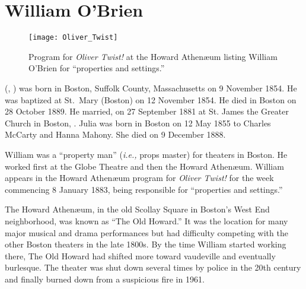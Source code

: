 \section{William O'Brien}\label{per:William3OBrien}

\begin{figure}[p]
	\centering
	\texttt{[image: Oliver\_Twist]}
	\caption{Program for \textit{Oliver Twist!} at the Howard Athen\ae um listing William O'Brien for ``properties and settings.''}
	\label{fig:OliverTwist}
\end{figure}

 (, ) was born in Boston, Suffolk County, Massachusetts on 9 November 1854.\cite{William3OBrienBirth} He was baptized at St.\ Mary (Boston) on 12 November 1854.\cite{William3OBrienBaptism} He died in Boston on 28 October 1889.\cite{William3OBrienDeath:1} He married, on 27 September 1881 at St. James the Greater Church in Boston, .\cite{William3OBrienMarriage} Julia was born in Boston on 12 May 1855 to Charles McCarty and Hanna Mahony.\cite{JuliaMcCartyBaptism} She died on 9 December 1888.\cite{JuliaMcCartyDeath:1}

William was a ``property man'' (\textit{i.e.,} props master\cite{PropertyMan}) for theaters in Boston. He worked first at the Globe Theatre\cite{WilliamOBrien1880} and then the Howard Athen\ae um.\cite{WilliamOBrien1883} William appears in the Howard Athen\ae um program for \textit{Oliver Twist!} for the week commencing 8 January 1883, being responsible for ``properties and settings.''\cite{William3OBrienProgram} 

The Howard Athen\ae um, in the old Scollay Square in Boston's West End neighborhood, was known as ``The Old Howard.'' It was the location for many major musical and drama performances but had difficulty competing with the other Boston theaters in the late 1800s. By the time William started working there, The Old Howard had shifted more toward vaudeville and eventually burlesque. The theater was shut down several times by police in the 20th century and finally burned down from a suspicious fire in 1961.\cite{HowardAthenaeum}

